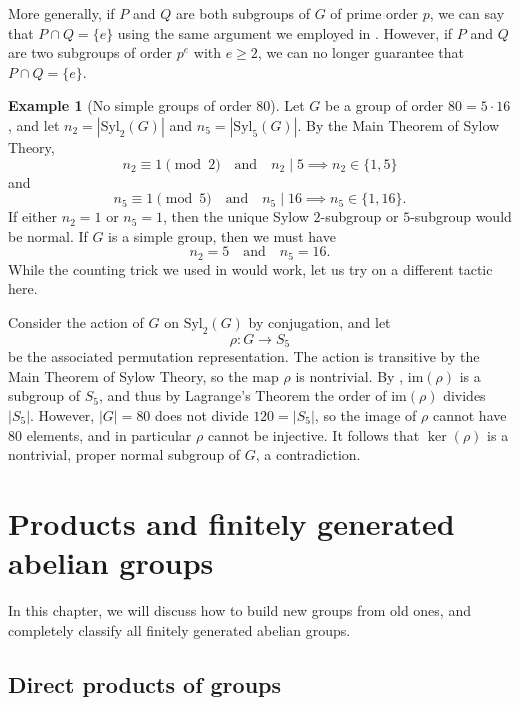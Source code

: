 \documentclass[12pt]{report}
\numberwithin{equation}{section}
\numberwithin{theorem}{chapter}
\theoremstyle{definition}
\newtheorem{example}[theorem]{Example}
\newtheorem*{basic properties}{Basic Properties}
\newtheorem*{Important Remark}{Important Remark}
\renewcommand{\ker}{\operatorname{ker}}
\begin{document}
More generally, if $P$ and $Q$ are both subgroups of $G$ of prime order $p$, we can say that $P \cap Q = \{ e \}$ using the same argument we employed in . However, if $P$ and $Q$ are two subgroups of order $p^e$ with $e \geqslant 2$, we can no longer guarantee that $P \cap Q = \{ e \}$.


\begin{example}[No simple groups of order $80$]
Let $G$ be a group of order $80=5 \cdot 16$, and let $n_2 = |\mathrm{Syl}_2(G)|$ and $n_5 = |\mathrm{Syl}_5(G)|$. By the Main Theorem of Sylow Theory,
$$n_2 \equiv 1 \!\!\pmod 2 \quad \text{and} \quad n_2 \mid 5 \implies n_2 \in \{1, 5\}$$
and
$$n_5 \equiv 1 \!\!\pmod 5 \quad \text{and} \quad n_5 \mid 16 \implies n_5 \in \{1, 16\}.$$
If either $n_2 = 1$ or $n_5=1$, then the unique Sylow $2$-subgroup or $5$-subgroup would be normal. If $G$ is a simple group, then we must have
$$n_2 = 5 \quad \text{and} \quad n_5 = 16.$$
While the counting trick we used in  would work, let us try on a different tactic here. 

Consider the action of $G$ on $\mathrm{Syl}_2(G)$ by conjugation, and let
$$\rho\!: G \to S_5$$
be the associated permutation representation. The action is transitive by the Main Theorem of Sylow Theory, so the map $\rho$ is nontrivial. By , $\mathrm{im}(\rho)$ is a subgroup of $S_5$, and thus by Lagrange's Theorem the order of $\mathrm{im}(\rho)$ divides $|S_5|$. However, $|G|=80$ does not divide $120 = |S_5|$, so the image of $\rho$ cannot have $80$ elements, and in particular $\rho$ cannot be injective. It follows that $\ker(\rho)$ is a nontrivial, proper normal subgroup of $G$, a contradiction.
\end{example}







\chapter{Products and finitely generated abelian groups}

In this chapter, we will discuss how to build new groups from old ones, and completely classify all finitely generated abelian groups.


\section{Direct products of groups} 
\end{document}

